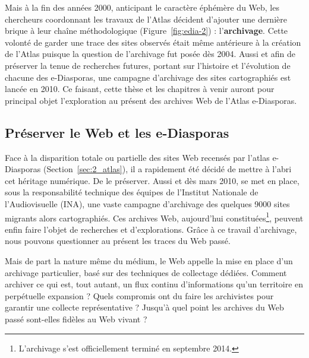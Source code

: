 \documentclass[symmetric,justified,marginals=raggedouter]{tufte-book}
\begin{document}
Mais à la fin des années 2000, anticipant le caractère éphémère du Web, les chercheurs coordonnant les travaux de l'Atlas décident d'ajouter une dernière brique à leur chaîne méthodologique (Figure~\ref{fig:edia-2}) : l'\textbf{archivage}. Cette volonté de garder une trace des sites observés était même antérieure à la création de l'Atlas puisque la question de l'archivage fut posée dès 2004. Aussi et afin de préserver la tenue de recherches futures, portant sur l'histoire et l'évolution de chacune des e-Diasporas, une campagne d'archivage des sites cartographiés est lancée en 2010. Ce faisant, cette thèse et les chapitres à venir auront pour principal objet l'exploration au présent des archives Web de l'Atlas e-Diasporas.     


\cleardoublepage
\begin{minipage}[t,leftmargin=5em]{1.5\linewidth}%
\begin{adjustwidth}{-0.5cm}{}
\chapter{Préserver le Web et les e-Diasporas}
\label{chap:3}
\end{adjustwidth}
\end{minipage}
\hfill

\noindent Face à la disparition totale ou partielle des sites Web recensés par l'atlas e-Diasporas (Section~\ref{sec:2_atlas}), il a rapidement été décidé de mettre à l'abri cet héritage numérique. De le préserver. Aussi et dès mars 2010, se met en place, sous la responsabilité technique des équipes de l'Institut Nationale de l'Audiovisuelle (INA), une vaste campagne d'archivage des quelques 9000 sites migrants alors cartographiés. Ces archives Web, aujourd'hui constituées\footnote{\RaggedOuter L'archivage s'est officiellement terminé en septembre 2014.}, peuvent enfin faire l'objet de recherches et d'explorations. Grâce à ce travail d'archivage, nous pouvons questionner au présent les traces du Web passé. 

Mais de part la nature même du médium, le Web appelle la mise en place d'un archivage particulier, basé sur des techniques de collectage dédiées. Comment archiver ce qui est, tout autant, un flux continu d'informations qu'un territoire en perpétuelle expansion ? Quels compromis ont du faire les archivistes pour garantir une collecte représentative ? Jusqu'à quel point les archives du Web passé sont-elles fidèles au Web vivant ? 
\end{document}
